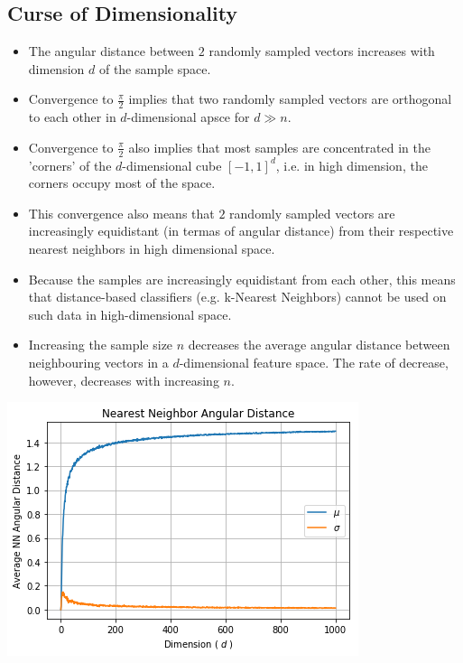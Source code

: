 \documentclass[english]{latex4ei/latex4ei_sheet}
\begin{document}
\begin{sectionbox}
\subsection{Curse of Dimensionality}
\begin{itemize}
    \item The angular distance between $2$ randomly sampled vectors increases with dimension $d$ of the sample space.
\item Convergence to $\frac{\pi}{2}$ implies that two randomly sampled vectors are orthogonal to each other in $d$-dimensional apsce for $d\gg n$.
\item Convergence to $\frac{\pi}{2}$ also implies that most samples are concentrated in the 'corners' of the $d$-dimensional cube $[-1, 1]^d$, i.e. in high dimension, the corners occupy most of the space.
\item This convergence also means that $2$ randomly sampled vectors are increasingly equidistant (in termas of angular distance) from their respective nearest neighbors in high dimensional space.
\item Because the samples are increasingly equidistant from each other, this means that distance-based classifiers (e.g. k-Nearest Neighbors) cannot be used on such data in high-dimensional space.
\item Increasing the sample size $n$ decreases the average angular distance between neighbouring vectors in a $d$-dimensional feature space. The rate of decrease, however, decreases with increasing $n$.
\end{itemize}

\begin{center}
	    \includegraphics[width = 0.9\columnwidth]{figures/angular_distance_plot.png}
	\end{center}


\end{sectionbox}
\end{document}
